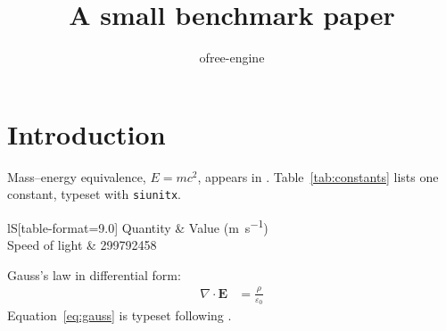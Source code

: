 \documentclass[11pt]{article}
\title{A small benchmark paper}
\author{ofree-engine}
\begin{document}
\maketitle

\section{Introduction}
Mass--energy equivalence, $E = mc^2$, appears in \cite{einstein1905}.
Table~\ref{tab:constants} lists one constant, typeset with \texttt{siunitx}.

\begin{table}[h]
  \centering
  \begin{tabular}{lS[table-format=9.0]}
    \toprule
    Quantity & {Value (\si{\metre\per\second})} \\
    \midrule
    Speed of light & 299792458 \\
    \bottomrule
  \end{tabular}
  \caption{A physical constant.}
  \label{tab:constants}
\end{table}

Gauss's law in differential form:
\begin{align}
  \nabla \cdot \mathbf{E} &= \frac{\rho}{\varepsilon_0} \label{eq:gauss}
\end{align}
Equation~\eqref{eq:gauss} is typeset following \cite{knuth1984}.

\printbibliography
\end{document}

